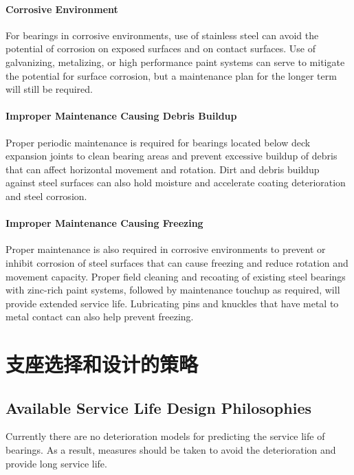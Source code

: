 \paragraph{Corrosive Environment}
For bearings in corrosive environments, use of stainless steel can avoid the potential of corrosion on exposed
surfaces and on contact surfaces. Use of galvanizing, metalizing, or high performance paint systems can serve to
mitigate the potential for surface corrosion, but a maintenance plan for the longer term will still be required.

\paragraph{Improper Maintenance Causing Debris Buildup}
Proper periodic maintenance is required for bearings located below deck expansion joints to clean bearing areas
and prevent excessive buildup of debris that can affect horizontal movement and rotation. Dirt and debris buildup
against steel surfaces can also hold moisture and accelerate coating deterioration and steel corrosion.

\paragraph{Improper Maintenance Causing Freezing}
Proper maintenance is also required in corrosive environments to prevent or inhibit corrosion of steel surfaces
that can cause freezing and reduce rotation and movement capacity. Proper field cleaning and recoating of existing
steel bearings with zinc-rich paint systems, followed by maintenance touchup as required, will provide extended
service life. Lubricating pins and knuckles that have metal to metal contact can also help prevent freezing.

\section{支座选择和设计的策略}
\label{sec:strategies-bearing-selection}
\subsection{Available Service Life Design Philosophies}
Currently there are no deterioration models for predicting the service life of bearings. As a result, measures
should be taken to avoid the deterioration and provide long service life.

